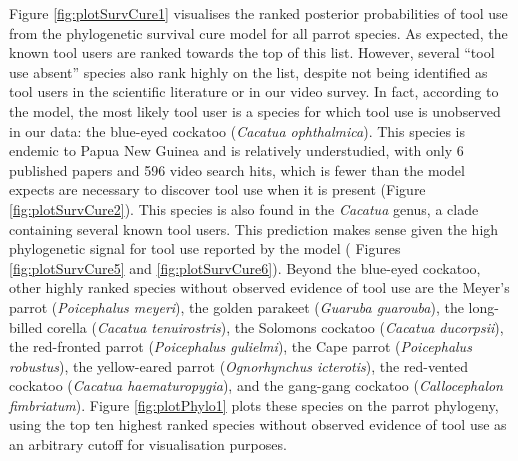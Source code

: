 \documentclass[
  man, donotrepeattitle,floatsintext]{apa6}
\begin{document}
Figure \ref{fig:plotSurvCure1} visualises the ranked posterior probabilities of
tool use from the phylogenetic survival cure model for all parrot species. As
expected, the known tool users are ranked towards the top of this list. However,
several ``tool use absent'' species also rank highly on the list, despite not
being identified as tool users in the scientific literature or in our video
survey. In fact, according to the model, the most likely tool user is a species
for which tool use is unobserved in our data: the blue-eyed cockatoo (\emph{Cacatua
ophthalmica}). This species is endemic to Papua New Guinea and is relatively
understudied, with only 6 published papers
and 596 video search hits, which is fewer than the
model expects are necessary to discover tool use when it is present (Figure
\ref{fig:plotSurvCure2}). This species is also found in the \emph{Cacatua} genus, a
clade containing several known tool users. This prediction makes sense given the
high phylogenetic signal for tool use reported by the model (
Figures \ref{fig:plotSurvCure5} and \ref{fig:plotSurvCure6}). Beyond the
blue-eyed cockatoo, other highly ranked species without observed evidence of
tool use are the Meyer's parrot (\emph{Poicephalus meyeri}), the golden parakeet
(\emph{Guaruba guarouba}), the long-billed corella (\emph{Cacatua tenuirostris}), the
Solomons cockatoo (\emph{Cacatua ducorpsii}), the red-fronted parrot (\emph{Poicephalus
gulielmi}), the Cape parrot (\emph{Poicephalus robustus}), the yellow-eared parrot
(\emph{Ognorhynchus icterotis}), the red-vented cockatoo (\emph{Cacatua haematuropygia}),
and the gang-gang cockatoo (\emph{Callocephalon fimbriatum}). Figure
\ref{fig:plotPhylo1} plots these species on the parrot phylogeny, using the top
ten highest ranked species without observed evidence of tool use as an arbitrary
cutoff for visualisation purposes.
\end{document}
